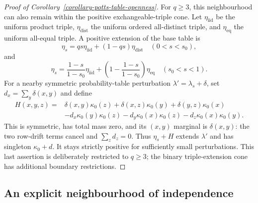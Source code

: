 \documentclass[a4paper,11pt,reqno]{amsart}
\theoremstyle{plain}
\theoremstyle{definition}
\theoremstyle{remark}
\begin{document}
\begin{proof}[Proof of Corollary~\ref{corollary-potts-table-openness}]
For $q\ge3$, this neighbourhood can also remain within the positive
exchangeable-triple cone.  Let $\eta_{\mathrm{iid}}$ be the uniform product
triple, $\eta_{\mathrm{dist}}$ the uniform ordered all-distinct triple,
and $\eta_{\mathrm{eq}}$ the uniform all-equal triple.  A positive extension
of the base table is
\[
 \eta_s=qs\eta_{\mathrm{iid}}+(1-qs)\eta_{\mathrm{dist}}
 \quad(0<s<s_0),
\]
and
\[
 \eta_s=\frac{1-s}{1-s_0}\eta_{\mathrm{iid}}
       +\left(1-\frac{1-s}{1-s_0}\right)\eta_{\mathrm{eq}}
 \quad(s_0<s<1).
\]
For a nearby symmetric probability-table perturbation
$\lambda'=\lambda_s+\delta$, set $d_x=\sum_y\delta(x,y)$ and define
\begin{align*}
 H(x,y,z)={}&\delta(x,y)\kappa_0(z)+\delta(x,z)\kappa_0(y)
             +\delta(y,z)\kappa_0(x)\\
 &-d_x\kappa_0(y)\kappa_0(z)-d_y\kappa_0(x)\kappa_0(z)
             -d_z\kappa_0(x)\kappa_0(y).
\end{align*}
This is symmetric, has total mass zero, and its $(x,y)$ marginal is
$\delta(x,y)$: the two row-drift terms cancel and $\sum_zd_z=0$.
Thus $\eta_s+H$ extends $\lambda'$ and has singleton
$\kappa_0+d$.  It stays strictly positive for sufficiently small
perturbations.  This last assertion is deliberately restricted to $q\ge3$;
the binary triple-extension cone has additional boundary restrictions.
\end{proof}

\subsection{An explicit neighbourhood of independence}
\end{document}
